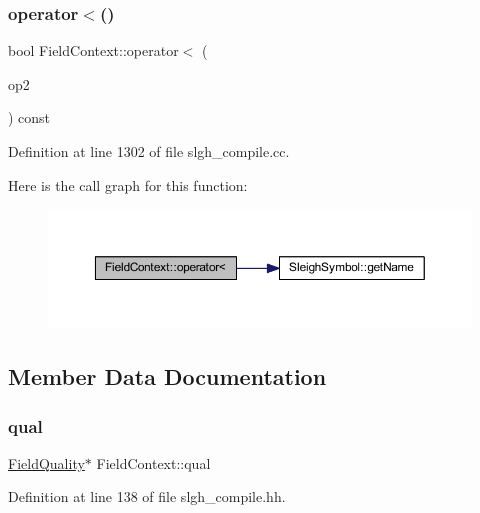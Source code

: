 \subsubsection{\texorpdfstring{operator$<$()}{operator<()}}
{\footnotesize\ttfamily bool Field\+Context\+::operator$<$ (\begin{DoxyParamCaption}\item[{const \mbox{\hyperlink{struct_field_context}{Field\+Context}} \&}]{op2 }\end{DoxyParamCaption}) const}



Definition at line 1302 of file slgh\+\_\+compile.\+cc.

Here is the call graph for this function\+:
\nopagebreak
\begin{figure}[H]
\begin{center}
\leavevmode
\includegraphics[width=350pt]{struct_field_context_a54651b3da2cdfea0a6dae7cba6404a8b_cgraph}
\end{center}
\end{figure}


\subsection{Member Data Documentation}
\mbox{\label{struct_field_context_aaae0dff4c44f91251e2e67af5b82376b}} 
\subsubsection{\texorpdfstring{qual}{qual}}
{\footnotesize\ttfamily \mbox{\hyperlink{struct_field_quality}{Field\+Quality}}$\ast$ Field\+Context\+::qual}



Definition at line 138 of file slgh\+\_\+compile.\+hh.

\mbox{\label{struct_field_context_aa55ff9eea0294c8f0d7fe47189975174}} 
